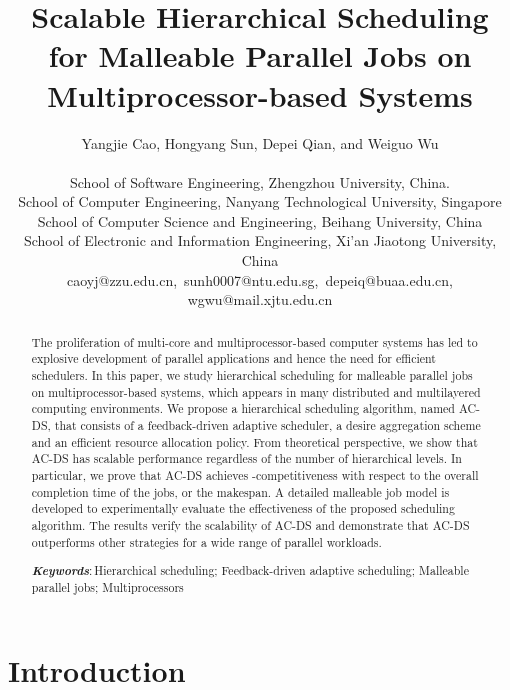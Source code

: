\documentclass[10pt, a4paper]{article}
\def\keywords{\vspace{.5em}
{\textit{\bf Keywords}:\,\relax }}
\def\endkeywords{\par}
\begin{document}
\title{Scalable Hierarchical Scheduling for Malleable Parallel Jobs on Multiprocessor-based Systems}\author{Yangjie Cao, Hongyang Sun, Depei Qian, and Weiguo Wu \\
 \\
School of Software Engineering, Zhengzhou University, China. \\
School of Computer Engineering, Nanyang Technological University, Singapore\\
School of Computer Science and Engineering, Beihang University, China\\
School of Electronic and Information Engineering, Xi'an Jiaotong University, China\\
caoyj@zzu.edu.cn,~sunh0007@ntu.edu.sg,~depeiq@buaa.edu.cn, wgwu@mail.xjtu.edu.cn
}\date{}
\maketitle

\begin{abstract}
The proliferation of multi-core and multiprocessor-based computer systems has led to explosive
development of parallel applications and hence the need for efficient schedulers. In this paper, we
study hierarchical scheduling for malleable parallel jobs on multiprocessor-based systems, which
appears in many distributed and multilayered computing environments. We propose a hierarchical
scheduling algorithm, named AC-DS, that consists of a feedback-driven adaptive scheduler, a desire
aggregation scheme and an efficient resource allocation policy. From theoretical perspective, we
show that AC-DS has scalable performance regardless of the number of hierarchical levels. In
particular, we prove that AC-DS achieves -competitiveness with respect to the overall
completion time of the jobs, or the makespan. A detailed malleable job model is developed to
experimentally evaluate the effectiveness of the proposed scheduling algorithm. The results verify
the scalability of AC-DS and demonstrate that AC-DS outperforms other strategies for a wide range
of parallel workloads.

\keywords Hierarchical scheduling; Feedback-driven adaptive scheduling; Malleable parallel jobs;
Multiprocessors
\endkeywords

\end{abstract}

\section{Introduction}
\end{document}
